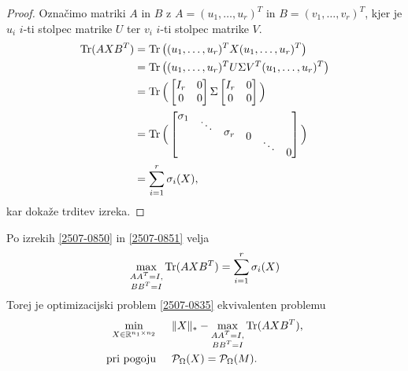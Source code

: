 \begin{proof}
    Označimo matriki $A$ in $B$ z
    $A = (u_1, \hdots , u_r)^T$ in $B = (v_1, \hdots , v_r)^T$,
    kjer je $u_i$ $i$-ti stolpec matrike $U$ ter $v_i$ $i$-ti stolpec
    matrike $V$.
    \begin{align*}
        \operatorname{Tr}(AXB^T) & = \operatorname{Tr}\big((u_1, \hdots , u_r)^T X (u_1, \hdots , u_r)^T\big)                                                                                                      \\
                   & = \operatorname{Tr}\big((u_1, \hdots , u_r)^T U \Sigma V^T (u_1, \hdots , u_r)^T\big)                                                                                           \\
                   & =\operatorname{Tr}\Big( \begin{bmatrix} I_r & 0 \\ 0 & 0 \end{bmatrix} \Sigma \begin{bmatrix} I_r & 0 \\ 0 & 0 \end{bmatrix}\Big)                                               \\
                   & = \operatorname{Tr}\Big(\begin{bmatrix} \sigma_1 \\[-8pt] & \ddots & & \\[-8pt] & & \sigma_r \\[-8pt] & &  & 0 \\[-8pt]  & & & & \ddots \\[-8pt] & & & & & 0 \end{bmatrix}\Big) \\
                   & = \sum_{i = 1}^{r} \sigma_i(X),
    \end{align*}
    kar dokaže trditev izreka.
\end{proof}
Po izrekih \ref{2507-0850} in \ref{2507-0851}
velja
\[
    \max_{
        \substack{AA^T = I,\\ BB^T = I}} \operatorname{Tr}(AXB^T) = \sum^{r}_{i = 1} \sigma_i(X)
\]
Torej je optimizacijski problem
\eqref{2507-0835} ekvivalenten
problemu
\begin{align*}
    \min_{X\in  \mathbb{R}^{n_1 \times n_2}}\hspace{0.5cm} & \lVert X\rVert_* - \max_{\substack{AA^T = I, \\ BB^T = I}} \operatorname{Tr}(AXB^T), \\
    \text{pri pogoju} \hspace{0.5cm}                       & \mathcal{P}_\Omega(X) = \mathcal{P}_\Omega(M).
\end{align*}

